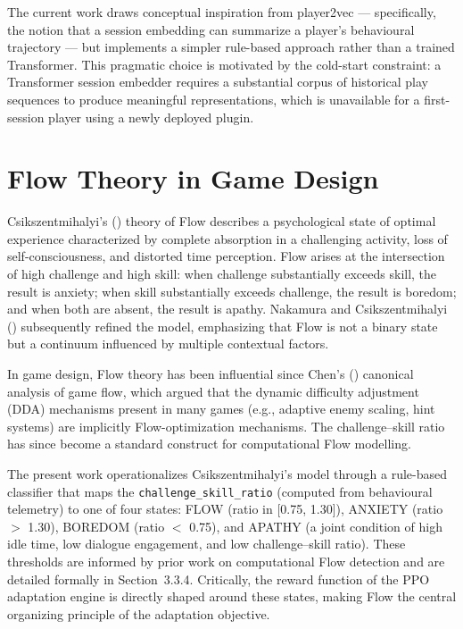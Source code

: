 \documentclass[12pt,a4paper]{report}
\begin{document}
The current work draws conceptual inspiration from player2vec --- specifically, the notion that a session embedding can summarize a player's behavioural trajectory --- but implements a simpler rule-based approach rather than a trained Transformer. This pragmatic choice is motivated by the cold-start constraint: a Transformer session embedder requires a substantial corpus of historical play sequences to produce meaningful representations, which is unavailable for a first-session player using a newly deployed plugin.

\section{Flow Theory in Game Design}

Csikszentmihalyi's (\citeyear{csikszentmihalyi1990flow}) theory of Flow describes a psychological state of optimal experience characterized by complete absorption in a challenging activity, loss of self-consciousness, and distorted time perception. Flow arises at the intersection of high challenge and high skill: when challenge substantially exceeds skill, the result is anxiety; when skill substantially exceeds challenge, the result is boredom; and when both are absent, the result is apathy. Nakamura and Csikszentmihalyi (\citeyear{nakamura2002concept}) subsequently refined the model, emphasizing that Flow is not a binary state but a continuum influenced by multiple contextual factors.

In game design, Flow theory has been influential since Chen's (\citeyear{chen2007flow}) canonical analysis of game flow, which argued that the dynamic difficulty adjustment (DDA) mechanisms present in many games (e.g., adaptive enemy scaling, hint systems) are implicitly Flow-optimization mechanisms. The challenge--skill ratio has since become a standard construct for computational Flow modelling.

The present work operationalizes Csikszentmihalyi's model through a rule-based classifier that maps the \texttt{challenge\_skill\_ratio} (computed from behavioural telemetry) to one of four states: FLOW (ratio in [0.75, 1.30]), ANXIETY (ratio $>$ 1.30), BOREDOM (ratio $<$ 0.75), and APATHY (a joint condition of high idle time, low dialogue engagement, and low challenge--skill ratio). These thresholds are informed by prior work on computational Flow detection \citep{yannakakis2009realtime} and are detailed formally in Section~3.3.4. Critically, the reward function of the PPO adaptation engine is directly shaped around these states, making Flow the central organizing principle of the adaptation objective.
\end{document}
